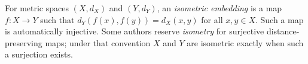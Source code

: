 
For metric spaces $(X,d_X)$ and $(Y,d_Y)$, an \emph{isometric embedding} is a map $f:X\to Y$ such that $d_Y(f(x),f(y))=d_X(x,y)$ for all $x,y\in X$. Such a map is automatically injective. Some authors reserve \emph{isometry} for surjective distance-preserving maps; under that convention $X$ and $Y$ are isometric exactly when such a surjection exists.
